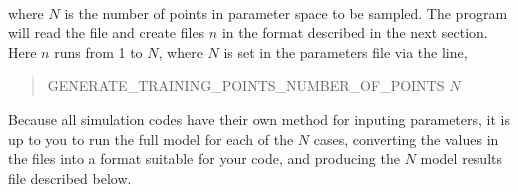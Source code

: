 \\
where $N$ is the number of points in parameter space to be sampled. The program will read the  file and create files $n$ in the format described in the next section. Here $n$ runs from 1 to $N$, where $N$ is set in the parameters file via the line,
\vspace*{-8pt}\begin{quote}
GENERATE\_TRAINING\_POINTS\_NUMBER\_OF\_POINTS $N$
\end{quote}\vspace*{-8pt}

Because all simulation codes have their own method for inputing parameters, it is up to you to run the full model for each of the $N$ cases, converting the values in the  files into a format suitable for your code, and producing the $N$ model results file described below. 
